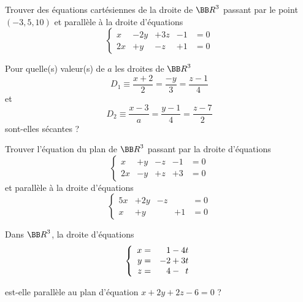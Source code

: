 \documentclass[12pt,french,oneside,a4paper]{memoir} %
\begin{document}
\begin{exo}
Trouver des équations cartésiennes de la droite de ${\BB R}^3$ passant par le point $(-3,5,10)$ 
et parallèle à la droite d'équations 
\begin{equation*}
\left\{ \begin{array}{rrrrl}
x &-2y &+3z &-1 &=0 \\
2x &+y &-z &+1 &=0
\end {array} \right.
\end{equation*}
\end{exo}

\begin{exo}
Pour quelle(s) valeur(s) de $a$ les droites de ${\BB R}^3$
\begin{equation*}
D_1 \equiv \frac{x+2}{2} = \frac{-y}{3} = \frac{z-1}{4}
\end{equation*}
et
\begin{equation*}
D_2 \equiv \frac{x-3}{a} = \frac{y-1}{4} = \frac{z-7}{2}
\end{equation*}
sont-elles sécantes ?
\end{exo}

\begin{exo}
Trouver l'équation du plan de ${\BB R}^3$ passant par la droite d'équations 
\begin{equation*}
\left\{ \begin{array}{rrrrl}
x &+y &-z &-1 &=0 \\
2x &-y &+z &+3 &=0
\end{array} \right.
\end{equation*}
et parallèle à la droite d'équations 
\begin{equation*}
\left\{ \begin{array}{rrrrl}
5x &+2y &-z & &=0 \\
x &+y & &+1 &=0
\end{array} \right.
\end{equation*}
\end{exo}

\begin{exo}
Dans ${\BB R}^3$, la droite d'équations 
\begin{equation*}
\left\{ \begin{array}{rr}
x= &\hphantom{+}1-4t \\
y= &-2+3t \\
z= &\hphantom{+}4-\hphantom{2}t
\end{array} \right.
\end{equation*}

est-elle parallèle au plan d'équation $x+2y+2z-6=0$ ?
\end{exo}
\end{document}
